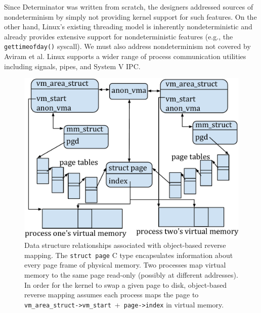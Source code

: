 \begin{itemize}

Since Determinator was
written from scratch, the designers addressed sources of nondeterminism by
simply not providing kernel support for such features. On the other hand,
Linux's existing threading model is inherently nondeterministic and already
provides extensive support for nondeterministic features (e.g., the
{\tt gettimeofday()} syscall). We must also address nondeterminism not covered
by Aviram et al. Linux supports a wider range of process communication utilities
including signals, pipes, and System V IPC.

\begin{figure}[t]
\includegraphics[scale=.39]{anon_vma.pdf}
\caption{Data structure relationships associated with object-based reverse
mapping. The {\tt struct page} C type encapsulates information about every
page frame of physical memory.
Two processes map virtual memory to the same page read-only (possibly
at different addresses). In order for the kernel to swap a given page to disk,
object-based reverse mapping assumes each process maps the page to
\mbox{{\tt vm\_area\_struct->vm\_start} + {\tt page->index}} in virtual
memory.}
\label{fig:anon_vma}
\end{figure}


\end{itemize}
